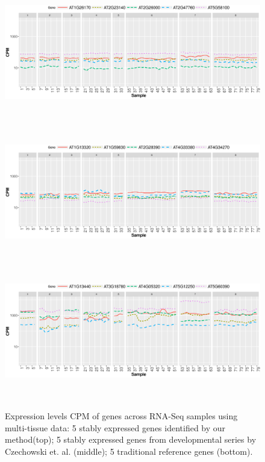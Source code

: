 \documentclass[11pt, a4paper]{article}
\begin{document}
 \begin{figure}[H]
\begin{center}
	\includegraphics[width=15cm,height=6cm]{Figures/A3.eps}
	\includegraphics[width=15cm,height=6cm]{Figures/A2.eps}
	\includegraphics[width=15cm,height=6cm]{Figures/A1.eps}
	\caption{{\small{\label{expressinlevel1} Expression levels CPM of genes across RNA-Seq samples using multi-tissue data: 5 stably expressed genes identified by our method(top)}; 5 stably expressed genes from developmental series by Czechowski et. al. (middle); 5 traditional reference genes (bottom).}}
\end{center}
\end{figure} 

\end{document}
